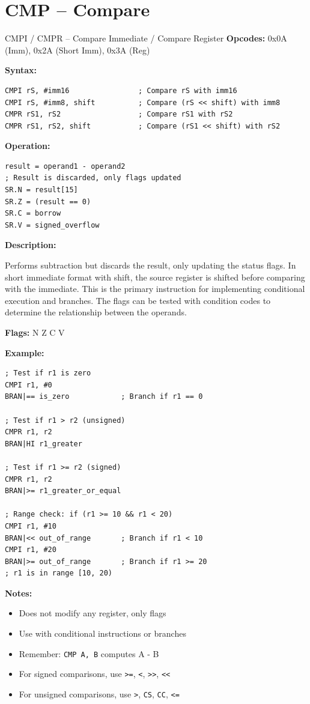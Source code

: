 \section{CMP -- Compare}

\begin{instructionbox}{CMPI / CMPR -- Compare Immediate / Compare Register}
	\textbf{Opcodes:} 0x0A (Imm), 0x2A (Short Imm), 0x3A (Reg)

	\textbf{Syntax:}
	\begin{lstlisting}
CMPI rS, #imm16                ; Compare rS with imm16
CMPI rS, #imm8, shift          ; Compare (rS << shift) with imm8
CMPR rS1, rS2                  ; Compare rS1 with rS2
CMPR rS1, rS2, shift           ; Compare (rS1 << shift) with rS2
\end{lstlisting}

	\textbf{Operation:}
	\begin{verbatim}
result = operand1 - operand2
; Result is discarded, only flags updated
SR.N = result[15]
SR.Z = (result == 0)
SR.C = borrow
SR.V = signed_overflow
\end{verbatim}

	\textbf{Description:}

	Performs subtraction but discards the result, only updating the status flags. In short immediate format with shift, the
	source register is shifted before comparing with the immediate. This is the primary instruction for implementing
	conditional execution and branches. The flags can be tested with condition codes to determine the relationship between
	the operands.

	\textbf{Flags:} N Z C V

	\textbf{Example:}
	\begin{lstlisting}
; Test if r1 is zero
CMPI r1, #0
BRAN|== is_zero            ; Branch if r1 == 0

; Test if r1 > r2 (unsigned)
CMPR r1, r2
BRAN|HI r1_greater

; Test if r1 >= r2 (signed)
CMPR r1, r2
BRAN|>= r1_greater_or_equal

; Range check: if (r1 >= 10 && r1 < 20)
CMPI r1, #10
BRAN|<< out_of_range       ; Branch if r1 < 10
CMPI r1, #20
BRAN|>= out_of_range       ; Branch if r1 >= 20
; r1 is in range [10, 20)
\end{lstlisting}

	\textbf{Notes:}
	\begin{itemize}
		\item Does not modify any register, only flags
		\item Use with conditional instructions or branches
		\item Remember: \texttt{CMP A, B} computes A - B
		\item For signed comparisons, use \texttt{>=}, \texttt{<}, \texttt{>>}, \texttt{<<}
		\item For unsigned comparisons, use \texttt{>}, \texttt{CS}, \texttt{CC}, \texttt{<=}
	\end{itemize}
\end{instructionbox}


